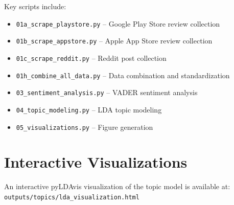 \documentclass[11pt,a4paper]{article}
\begin{document}
Key scripts include:
\begin{itemize}
    \item \texttt{01a\_scrape\_playstore.py} -- Google Play Store review collection
    \item \texttt{01b\_scrape\_appstore.py} -- Apple App Store review collection
    \item \texttt{01c\_scrape\_reddit.py} -- Reddit post collection
    \item \texttt{01h\_combine\_all\_data.py} -- Data combination and standardization
    \item \texttt{03\_sentiment\_analysis.py} -- VADER sentiment analysis
    \item \texttt{04\_topic\_modeling.py} -- LDA topic modeling
    \item \texttt{05\_visualizations.py} -- Figure generation
\end{itemize}

\section{Interactive Visualizations}

An interactive pyLDAvis visualization of the topic model is available at: \\
\texttt{outputs/topics/lda\_visualization.html}
\end{document}
